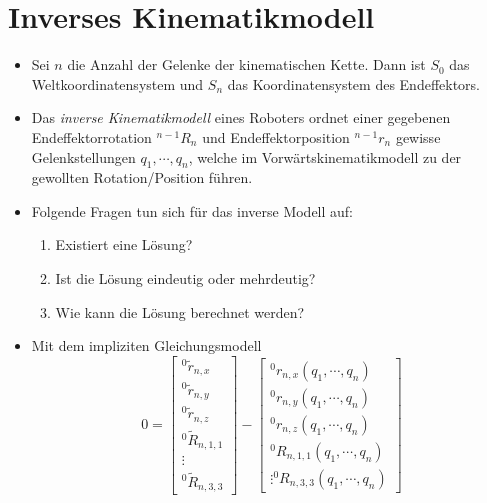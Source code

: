     \section{Inverses Kinematikmodell} %
        \begin{itemize}
        	\item Sei \( n \) die Anzahl der Gelenke der kinematischen Kette. Dann ist \( S _ 0 \) das Weltkoordinatensystem und \( S _ n \) das Koordinatensystem des Endeffektors.
        	\item Das \textit{inverse Kinematikmodell} eines Roboters ordnet einer gegebenen Endeffektorrotation \( ^{n-1}R_n \) und Endeffektorposition \( ^{n-1}r_n \) gewisse Gelenkstellungen \( q _ 1, \cdots, q _ n \), welche im Vorwärtskinematikmodell zu der gewollten Rotation/Position führen.
        	\item Folgende Fragen tun sich für das inverse Modell auf:
	        	\begin{enumerate}
	        		\item Existiert eine Lösung?
	        		\item Ist die Lösung eindeutig oder mehrdeutig?
	        		\item Wie kann die Lösung berechnet werden?
	        	\end{enumerate}
	        \item Mit dem impliziten Gleichungsmodell
		        \begin{equation*}
			        0 =
				        \begin{bmatrix}
					        ^0\tilde{r}_{n,x} \\
					        ^0\tilde{r}_{n,y} \\
					        ^0\tilde{r}_{n,z} \\
					        ^0\tilde{R}_{n,1,1} \\
					        \vdots \\
					        ^0\tilde{R}_{n,3,3}
				        \end{bmatrix}
				    -
					    \begin{bmatrix}
						    ^0r_{n,x}(q_1, \cdots, q_n) \\
						    ^0r_{n,y}(q_1, \cdots, q_n) \\
						    ^0r_{n,z}(q_1, \cdots, q_n) \\
						    ^0R_{n,1,1}(q_1, \cdots, q_n) \\
						    \vdots
						    ^0R_{n,3,3}(q_1, \cdots, q_n)
					    \end{bmatrix}
		        \end{equation*}

\end{itemize}
